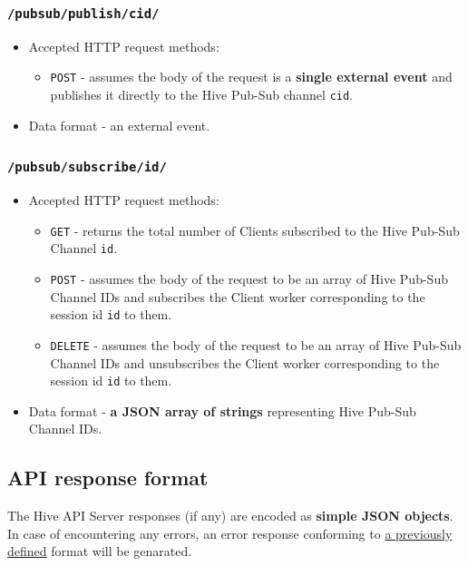 \documentclass[a4paper]{article}
\begin{document}
\subsubsection{\texttt{/pubsub/publish/cid/}}
\label{sec-6-1-8}



\begin{itemize}
\item Accepted HTTP request methods:
\begin{itemize}
\item \texttt{POST} - assumes the body of the request is a \textbf{single external event} and publishes it directly to the Hive Pub-Sub channel \texttt{cid}.
\end{itemize}
\item Data format - an external event.
\end{itemize}
\subsubsection{\texttt{/pubsub/subscribe/id/}}
\label{sec-6-1-9}



\begin{itemize}
\item Accepted HTTP request methods:
\begin{itemize}
\item \texttt{GET} - returns the total number of Clients subscribed to the Hive Pub-Sub Channel \texttt{id}.
\item \texttt{POST} - assumes the body of the request to be an array of Hive Pub-Sub Channel IDs and subscribes the Client worker corresponding to the session id \texttt{id} to them.
\item \texttt{DELETE} - assumes the body of the request to be an array of Hive Pub-Sub Channel IDs and unsubscribes the Client worker corresponding to the session id \texttt{id} to them.
\end{itemize}
\item Data format - \textbf{a JSON array of strings} representing Hive Pub-Sub Channel IDs.
\end{itemize}
\subsection{API response format}
\label{sec-6-2}

The Hive API Server responses (if any) are encoded as \textbf{simple JSON objects}. In case of encountering any errors, an error response conforming to \hyperref[sec-5-4]{a previously defined} format will be genarated.
\end{document}
